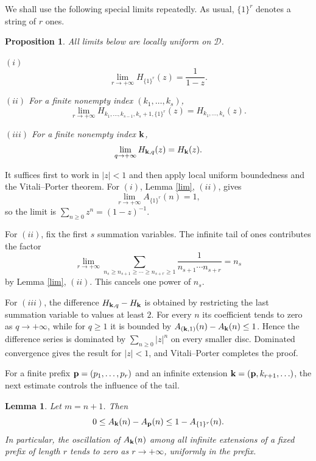 \documentclass[12pt,a4paper]{amsart}
\makeatletter
\numberwithin{equation}{section}
\renewenvironment{proof}[1][Proof]{%
  \par\pushQED{\qed}%
  \normalfont\topsep6\p@\@plus6\p@\relax
  \trivlist
  \item[\hskip\labelsep\bfseries #1:]\ignorespaces
}{%
  \popQED\endtrivlist\@endpefalse
}
\theoremstyle{plain}
\newtheorem{lem}[Thm]{Lemma}
\newtheorem{prop}[Thm]{Proposition}
\theoremstyle{definition}
\makeatother
\begin{document}
We shall use the following special limits repeatedly.  As usual, $\{1\}^{r}$ denotes a string of $r$ ones.

\begin{prop}\label{speciallimits}
All limits below are locally uniform on $\mathcal{D}$.

$(i)$
\[
\lim_{r\rightarrow+\infty}H_{\{1\}^{r}}(z)=\frac1{1-z}.
\]

$(ii)$ For a finite nonempty index $(k_1,\ldots,k_s)$,
\[
\lim_{r\rightarrow+\infty}
H_{k_1,\ldots,k_{s-1},k_s+1,\{1\}^{r}}(z)
=H_{k_1,\ldots,k_s}(z).
\]

$(iii)$ For a finite nonempty index ${\bf k}$,
\[
\lim_{q\rightarrow+\infty}H_{{\bf k},q}(z)=H_{\bf k}(z).
\]
\end{prop}

\begin{proof}
It suffices first to work in $|z|<1$ and then apply local uniform boundedness and the Vitali--Porter theorem.  For $(i)$, Lemma \ref{lim}, $(ii)$, gives
\[
\lim_{r\rightarrow+\infty}A_{\{1\}^{r}}(n)=1,
\]
so the limit is $\sum_{n\geq 0}z^n=(1-z)^{-1}$.

For $(ii)$, fix the first $s$ summation variables.  The infinite tail of ones contributes the factor
\[
\lim_{r\rightarrow+\infty}
\sum_{n_s\geq n_{s+1}\geq\cdots\geq n_{s+r}\geq 1}
\frac1{n_{s+1}\cdots n_{s+r}}=n_s
\]
by Lemma \ref{lim}, $(ii)$.  This cancels one power of $n_s$.

For $(iii)$, the difference $H_{{\bf k},q}-H_{\bf k}$ is obtained by restricting the last summation variable to values at least $2$.  For every $n$ its coefficient tends to zero as $q\rightarrow+\infty$, while for $q\geq1$ it is bounded by $A_{({\bf k},1)}(n)-A_{\bf k}(n)\leq1$.  Hence the difference series is dominated by $\sum_{n\geq0}|z|^n$ on every smaller disc.  Dominated convergence gives the result for $|z|<1$, and Vitali--Porter completes the proof.
\end{proof}

For a finite prefix ${\bf p}=(p_1,\ldots,p_r)$ and an infinite extension ${\bf k}=({\bf p},k_{r+1},\ldots)$, the next estimate controls the influence of the tail.

\begin{lem}\label{tailosc}
Let $m=n+1$.  Then
\begin{equation}\label{tailoscineq}
0\leq A_{\bf k}(n)-A_{\bf p}(n)
\leq 1-A_{\{1\}^{r}}(n).
\end{equation}
In particular, the oscillation of $A_{\bf k}(n)$ among all infinite extensions of a fixed prefix of length $r$ tends to zero as $r\rightarrow+\infty$, uniformly in the prefix.
\end{lem}
\end{document}
